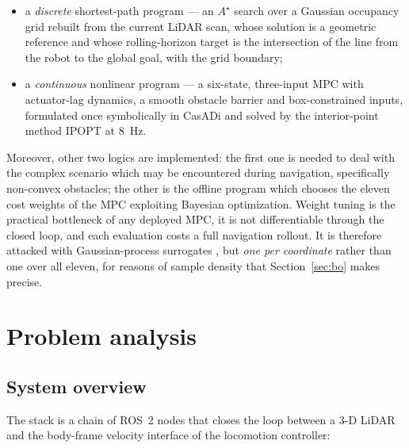 \documentclass[11pt,a4paper]{article}
\newcommand{\astar}{$A^\star$}
\begin{document}
\begin{itemize}
  \item a \emph{discrete} shortest-path program --- an \astar{} search over a Gaussian occupancy grid rebuilt
        from the current LiDAR scan, whose solution is a geometric reference and whose rolling-horizon target
        is the intersection of the line from the robot to the global goal, with the grid boundary;
  \item a \emph{continuous} nonlinear program --- a six-state, three-input MPC with actuator-lag dynamics, a
        smooth obstacle barrier and box-constrained inputs, formulated once symbolically in CasADi
        \cite{andersson2019casadi} and solved by the interior-point method IPOPT
        \cite{wachter2006ipopt} at $8$~Hz.
\end{itemize}

Moreover, other two logics are implemented: the first one is needed to deal with the complex scenario which may be encountered during navigation, specifically non-convex obstacles; the other is the offline program which chooses the eleven cost weights of the MPC exploiting Bayesian optimization. Weight tuning is the practical bottleneck of any deployed MPC,
it is not differentiable through the closed loop, and each evaluation costs a full navigation rollout. It is
therefore attacked with Gaussian-process surrogates \cite{rasmussen2006gp,shahriari2016bo}, but
\emph{one per coordinate} rather than one over all eleven, for reasons of sample density that
Section~\ref{sec:bo} makes precise.

\section{Problem analysis}
\label{sec:problem}

\subsection{System overview}
\label{sec:overview}

The stack is a chain of ROS~2 nodes that closes the loop between a 3-D LiDAR and the
body-frame velocity interface of the locomotion controller:
\end{document}
